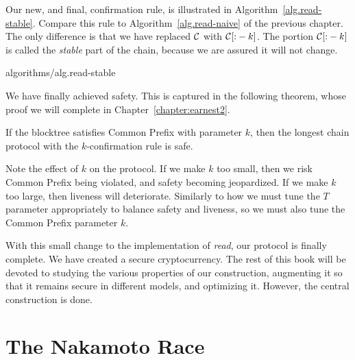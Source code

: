 Our new, and final, confirmation rule, is illustrated in
Algorithm~\ref{alg.read-stable}. Compare this rule to Algorithm~\ref{alg.read-naive} of
the previous chapter. The only difference is that we have replaced $\mathcal{C}$ with $\mathcal{C}[{:}-k]$.
The portion $\mathcal{C}[{:}-k]$ is called the \emph{stable} part of the chain, because we
are assured it will not change.

{algorithms/alg.read-stable}

We have finally achieved safety. This is captured in the following theorem, whose proof we will
complete in Chapter~\ref{chapter:earnest2}.

\begin{theorem}
    If the blocktree satisfies Common Prefix with parameter $k$, then the longest chain protocol
    with the $k$-confirmation rule is safe.
\end{theorem}

Note the effect of $k$ on the protocol. If we make $k$ too small, then we risk Common Prefix
being violated, and safety becoming jeopardized. If we make $k$ too large, then liveness will
deteriorate. Similarly to how we must tune the $T$ parameter appropriately to balance safety
and liveness, so we must also tune the Common Prefix parameter $k$.

With this small change to the implementation of \emph{read}, our protocol is finally complete.
We have created a secure cryptocurrency. The rest of this book will be devoted to studying the
various properties of our construction, augmenting it so that it remains secure in different models,
and optimizing it. However, the central construction is done.

\section{The Nakamoto Race}

